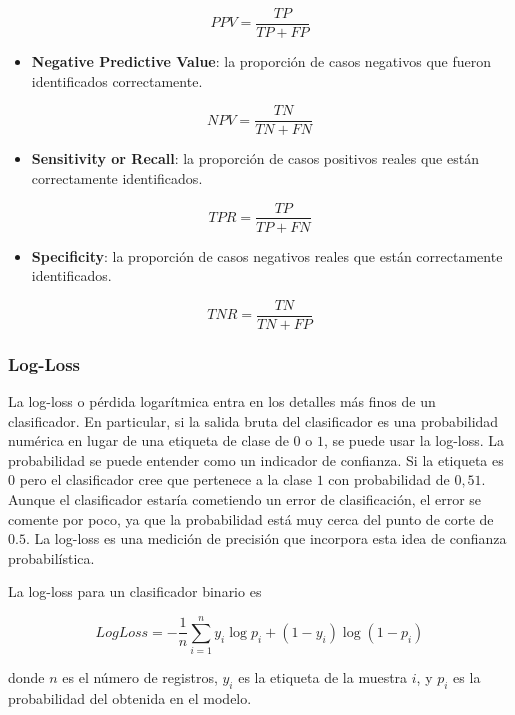\documentclass[]{book}
\providecommand{\tightlist}{%
  \setlength{\itemsep}{0pt}\setlength{\parskip}{0pt}}
\begin{document}
\[PPV = \frac{TP}{TP+FP}\]

\begin{itemize}
\tightlist
\item
  \textbf{Negative Predictive Value}: la proporción de casos negativos que fueron identificados correctamente.
\end{itemize}

\[ 
NPV = \frac{TN}{TN+FN}
\]

\begin{itemize}
\tightlist
\item
  \textbf{Sensitivity or Recall}: la proporción de casos positivos reales que están correctamente identificados.
\end{itemize}

\[TPR = \frac{TP}{TP+FN}\]

\begin{itemize}
\tightlist
\item
  \textbf{Specificity}: la proporción de casos negativos reales que están correctamente identificados.
\end{itemize}

\[TNR = \frac{TN}{TN+FP}\]

\hypertarget{log-loss}{%
\subsubsection{Log-Loss}\label{log-loss}}

La log-loss o pérdida logarítmica entra en los detalles más finos de un clasificador. En particular, si la salida bruta del clasificador es una probabilidad numérica en lugar de una etiqueta de clase de \(0\) o \(1\), se puede usar la log-loss. La probabilidad se puede entender como un indicador de confianza. Si la etiqueta es \(0\) pero el clasificador cree que pertenece a la clase \(1\) con probabilidad de \(0,51\). Aunque el clasificador estaría cometiendo un error de clasificación, el error se comente por poco, ya que la probabilidad está muy cerca del punto de corte de \(0.5\). La log-loss es una medición de precisión que incorpora esta idea de confianza probabilística.

La log-loss para un clasificador binario es

\[LogLoss = - \frac{1}{n} \sum_{i=1}^{n} y_i \log p_i + (1-y_i) \log (1-p_i)\]

donde \(n\) es el número de registros, \(y_i\) es la etiqueta de la muestra \(i\), y \(p_i\) es la probabilidad del obtenida en el modelo.
\end{document}
